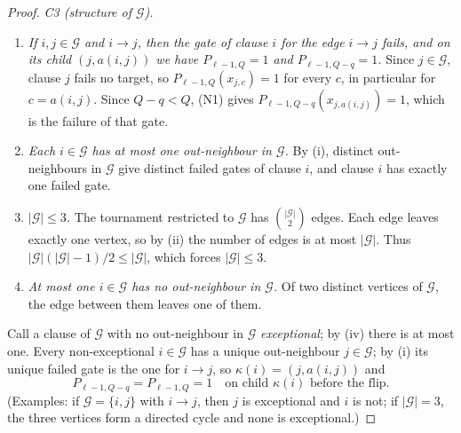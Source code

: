 \documentclass[11pt]{article}
\theoremstyle{definition}
\theoremstyle{remark}
\begin{document}
\begin{proof}
\smallskip\noindent\emph{C3 (structure of \(\mathcal G\)).}
\begin{enumerate}[label=\textup{(\roman*)},nosep]
\item \emph{If \(i,j\in\mathcal G\) and \(i\to j\), then the gate of clause
 \(i\) for the edge \(i\to j\) fails, and on its child \((j,a(i,j))\) we
 have \(P_{\ell-1,Q}=1\) and \(P_{\ell-1,Q-q}=1\).} Since
 \(j\in\mathcal G\), clause \(j\) fails no target, so
 \(P_{\ell-1,Q}(x_{j,c})=1\) for every \(c\), in particular for
 \(c=a(i,j)\). Since \(Q-q<Q\), (N1) gives
 \(P_{\ell-1,Q-q}(x_{j,a(i,j)})=1\), which is the failure of that gate.
\item \emph{Each \(i\in\mathcal G\) has at most one out-neighbour in
 \(\mathcal G\).} By (i), distinct out-neighbours in \(\mathcal G\) give
 distinct failed gates of clause \(i\), and clause \(i\) has exactly one
 failed gate.
\item \emph{\(|\mathcal G|\le3\).} The tournament restricted to
 \(\mathcal G\) has \(\binom{|\mathcal G|}{2}\) edges. Each edge leaves
 exactly one vertex, so by (ii) the number of edges is at most
 \(|\mathcal G|\). Thus
 \(|\mathcal G|(|\mathcal G|-1)/2\le|\mathcal G|\), which forces
 \(|\mathcal G|\le3\).
\item \emph{At most one \(i\in\mathcal G\) has no out-neighbour in
 \(\mathcal G\).} Of two distinct vertices of \(\mathcal G\), the edge
 between them leaves one of them.
\end{enumerate}
Call a clause of \(\mathcal G\) with no out-neighbour in \(\mathcal G\)
\emph{exceptional}; by (iv) there is at most one. Every non-exceptional
\(i\in\mathcal G\) has a unique out-neighbour \(j\in\mathcal G\); by (i) its
unique failed gate is the one for \(i\to j\), so
\(\kappa(i)=(j,a(i,j))\) and
\begin{equation}\label{eq:G-before}
 P_{\ell-1,Q-q}=P_{\ell-1,Q}=1\quad\text{on child }\kappa(i)\text{ before the flip.}
\end{equation}
(Examples: if \(\mathcal G=\{i,j\}\) with \(i\to j\), then \(j\) is
exceptional and \(i\) is not; if \(|\mathcal G|=3\), the three vertices form
a directed cycle and none is exceptional.)


\end{proof}
\end{document}
